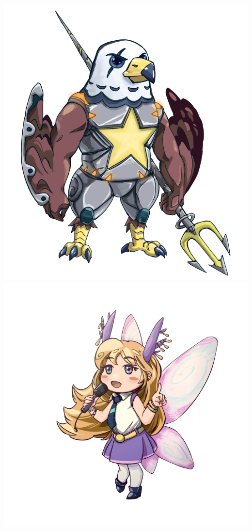 \begin{center}
\includegraphics[height=0.40\textheight]{Assets/starsmash_small}
\includegraphics[height=0.40\textheight]{Assets/camo_small}
\end{center}

